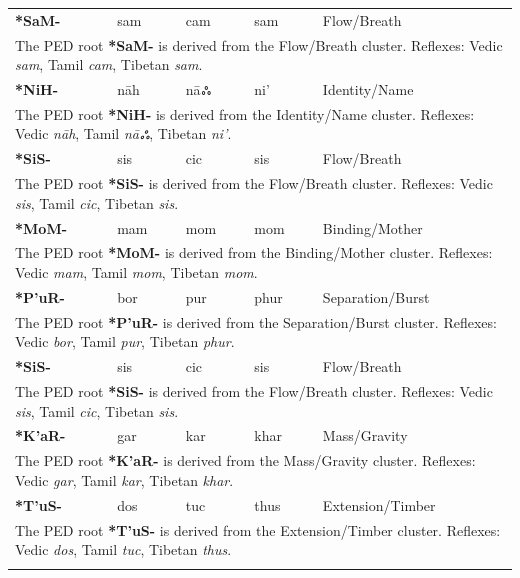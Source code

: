 \begin{longtable}{p{} p{} p{} p{} p{}}
\textbf{*SaM-} & sam & cam & sam & Flow/Breath \\ 
\multicolumn{5}{p{\textwidth}}{\small The PED root \textbf{*SaM-} is derived from the Flow/Breath cluster. Reflexes: Vedic \textit{sam}, Tamil \textit{cam}, Tibetan \textit{sam}. } \\ \addlinespace 
\textbf{*NiH-} & nāh & nāஃ & ni' & Identity/Name \\ 
\multicolumn{5}{p{\textwidth}}{\small The PED root \textbf{*NiH-} is derived from the Identity/Name cluster. Reflexes: Vedic \textit{nāh}, Tamil \textit{nāஃ}, Tibetan \textit{ni'}. } \\ \addlinespace 
\textbf{*SiS-} & sis & cic & sis & Flow/Breath \\ 
\multicolumn{5}{p{\textwidth}}{\small The PED root \textbf{*SiS-} is derived from the Flow/Breath cluster. Reflexes: Vedic \textit{sis}, Tamil \textit{cic}, Tibetan \textit{sis}. } \\ \addlinespace 
\textbf{*MoM-} & mam & mom & mom & Binding/Mother \\ 
\multicolumn{5}{p{\textwidth}}{\small The PED root \textbf{*MoM-} is derived from the Binding/Mother cluster. Reflexes: Vedic \textit{mam}, Tamil \textit{mom}, Tibetan \textit{mom}. } \\ \addlinespace 
\textbf{*P'uR-} & bor & pur & phur & Separation/Burst \\ 
\multicolumn{5}{p{\textwidth}}{\small The PED root \textbf{*P'uR-} is derived from the Separation/Burst cluster. Reflexes: Vedic \textit{bor}, Tamil \textit{pur}, Tibetan \textit{phur}. } \\ \addlinespace 
\textbf{*SiS-} & sis & cic & sis & Flow/Breath \\ 
\multicolumn{5}{p{\textwidth}}{\small The PED root \textbf{*SiS-} is derived from the Flow/Breath cluster. Reflexes: Vedic \textit{sis}, Tamil \textit{cic}, Tibetan \textit{sis}. } \\ \addlinespace 
\textbf{*K'aR-} & gar & kar & khar & Mass/Gravity \\ 
\multicolumn{5}{p{\textwidth}}{\small The PED root \textbf{*K'aR-} is derived from the Mass/Gravity cluster. Reflexes: Vedic \textit{gar}, Tamil \textit{kar}, Tibetan \textit{khar}. } \\ \addlinespace 
\textbf{*T'uS-} & dos & tuc & thus & Extension/Timber \\ 
\multicolumn{5}{p{\textwidth}}{\small The PED root \textbf{*T'uS-} is derived from the Extension/Timber cluster. Reflexes: Vedic \textit{dos}, Tamil \textit{tuc}, Tibetan \textit{thus}. } \\ \addlinespace 

\end{longtable}
